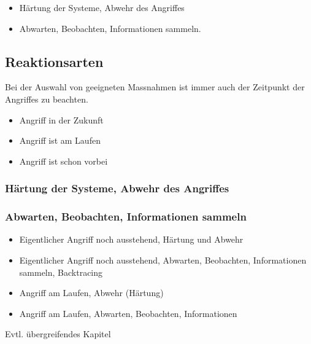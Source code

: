 \begin{itemize}
  \item Härtung der Systeme, Abwehr des Angriffes
  \item Abwarten, Beobachten, Informationen sammeln.
\end{itemize}


\subsection{Reaktionsarten}
Bei der Auswahl von geeigneten Massnahmen ist immer auch der Zeitpunkt der Angriffes zu beachten.

\begin{itemize}
  \item Angriff in der Zukunft
  \item Angriff ist am Laufen
  \item Angriff ist schon vorbei
\end{itemize}


\subsubsection{Härtung der Systeme, Abwehr des Angriffes}

\subsubsection{Abwarten, Beobachten, Informationen sammeln}

\begin{itemize}
  \item Eigentlicher Angriff noch ausstehend, Härtung und Abwehr
  \item Eigentlicher Angriff noch ausstehend, Abwarten, Beobachten, Informationen sammeln, Backtracing
  \item Angriff am Laufen, Abwehr (Härtung)
  \item Angriff am Laufen, Abwarten, Beobachten, Informationen
\end{itemize}


Evtl. übergreifendes Kapitel
